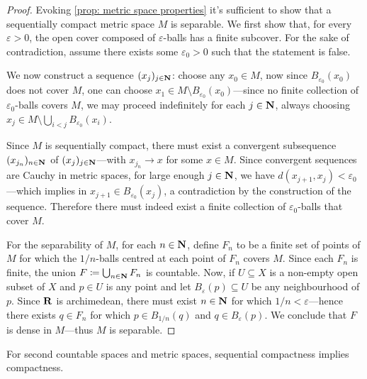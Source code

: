 \begin{proof}
    Evoking \cref{prop: metric space properties} it's sufficient to show that a
    sequentially compact metric space \(M\) is separable. We first show that, for
    every \(\varepsilon > 0\), the open cover composed of \(\varepsilon\)-balls has
    a finite subcover. For the sake of contradiction, assume there exists some
    \(\varepsilon_0 > 0\) such that the statement is false.

    We now construct a sequence \((x_j)_{j \in \mathbf{N}}\): choose any \(x_0 \in M\), now
    since \(B_{\varepsilon_0}(x_0)\) does not cover \(M\), one can choose
    \(x_1 \in M \setminus B_{\varepsilon_0}(x_0)\)---since no finite collection of
    \(\varepsilon_0\)-balls covers \(M\), we may proceed indefinitely for each
    \(j \in \mathbf{N}\), always choosing
    \(x_j \in M \setminus \bigcup_{i < j} B_{\varepsilon_0}(x_i)\).

    Since \(M\) is sequentially compact, there must exist a convergent subsequence
    \((x_{j_n})_{n \in \mathbf{N}}\) of \((x_j)_{j \in \mathbf{N}}\)---with \(x_{j_n} \to x\) for
    some \(x \in M\). Since convergent sequences are Cauchy in metric spaces, for
    large enough \(j \in \mathbf{N}\), we have \(d(x_{j+1}, x_j) < \varepsilon_0\)---which
    implies in \(x_{j+1} \in B_{\varepsilon_0}(x_j)\), a contradiction by the
    construction of the sequence. Therefore there must indeed exist a finite
    collection of \(\varepsilon_0\)-balls that cover \(M\).

    For the separability of \(M\), for each \(n \in \mathbf{N}\), define \(F_n\) to be a
    finite set of points of \(M\) for which the \(1/n\)-balls centred at each point
    of \(F_n\) covers \(M\). Since each \(F_n\) is finite, the union
    \(F \coloneq \bigcup_{n \in \mathbf{N}} F_n\) is countable. Now, if \(U \subseteq X\) is
    a non-empty open subset of \(X\) and \(p \in U\) is any point and let
    \(B_{\varepsilon}(p) \subseteq U\) be any neighbourhood of \(p\). Since \(\mathbf{R}\)
    is archimedean, there must exist \(n \in \mathbf{N}\) for which
    \(1/n < \varepsilon\)---hence there exists \(q \in F_n\) for which
    \(p \in B_{1/n}(q)\) and \(q \in B_{\varepsilon}(p)\). We conclude that \(F\) is
    dense in \(M\)---thus \(M\) is separable.
\end{proof}

\begin{proposition}
    \label{prop:metric-2nd-ctbl-seq-comp-implies-comp}
    For second countable spaces and metric spaces, sequential compactness implies
    compactness.
\end{proposition}

